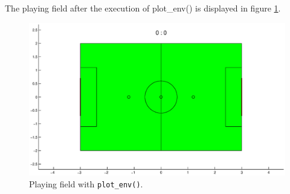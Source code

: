 The playing field after the execution of {\selectfont plot\_env()} is displayed in figure \ref{Playing_field}.

\begin{figure}[h]
	\centering
    	\includegraphics[width=14cm]{./2_Simulation/playing_field}
  	\caption{Playing field with \texttt{plot\_env()}.}
  	\label{Playing_field}
\end{figure}
\pagebreak[4]

